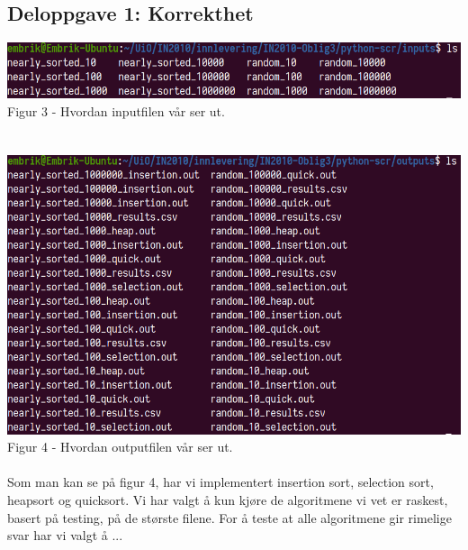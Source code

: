 \documentclass[a4paper, article, oneside, norsk]{memoir} %
\newcommand{\0}{\mathbf{0}}
\newcommand{\1}{\mathbf{1}}
\begin{document}
\subsection*{Deloppgave 1: Korrekthet}
\includegraphics[scale=0.5]{IN2010oblig3_inputs.png}
\\
Figur 3 - Hvordan inputfilen vår ser ut. 
\\
\\
\\
\includegraphics[scale=0.4]{IN2010oblig3_outputs.png}
\\
Figur 4 - Hvordan outputfilen vår ser ut.
\\
\\
Som man kan se på figur 4, har vi implementert insertion sort, selection sort, heapsort og quicksort. Vi har valgt å kun kjøre de algoritmene vi vet er raskest, basert på testing, på de største filene. For å teste at alle algoritmene gir rimelige svar har vi valgt å ...
\\
\end{document}
